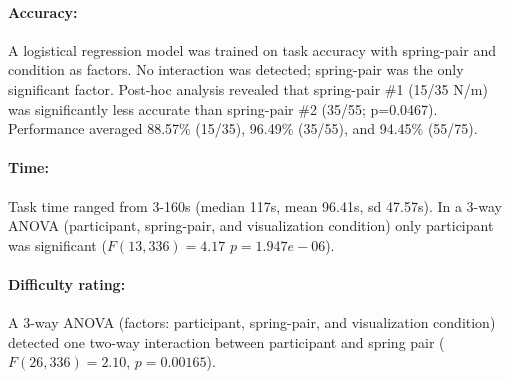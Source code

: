 \paragraph{Accuracy:}
A logistical regression model was trained on task accuracy with spring-pair and condition as factors. %
No interaction was detected; spring-pair was the only significant factor.
Post-hoc analysis revealed that spring-pair \#1 (15/35 N/m) was significantly less accurate than spring-pair \#2 (35/55; p=0.0467). %
Performance averaged 88.57\% (15/35), 96.49\% (35/55), and 94.45\% (55/75). 


\paragraph{Time:}
Task time ranged from 3-160s (median 117s, mean 96.41s, sd 47.57s).
In a 3-way ANOVA (participant, spring-pair, and visualization condition) 
only participant was significant  ($F(13,336)= 4.17$ $p=1.947e-06$).


\paragraph{Difficulty rating:}
A 3-way ANOVA (factors: participant, spring-pair, and visualization condition) %
detected one two-way interaction between participant and spring pair ($F(26,336)= 2.10$, $p=0.00165$).



